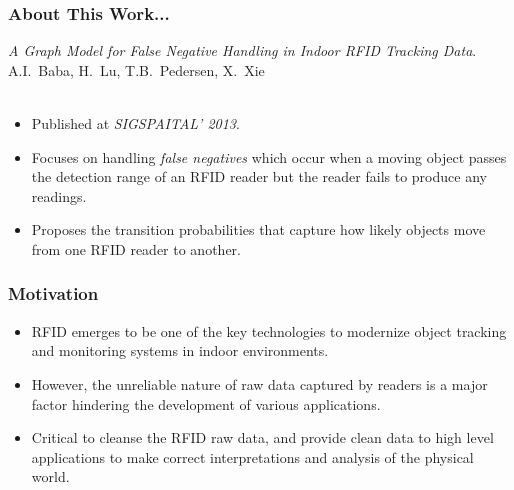 \begin{frame}
\frametitle{About This Work...}

\emph{A Graph Model for False Negative Handling in Indoor RFID Tracking Data}.~\cite{baba2013graph} \\
A.I.~Baba, H.~Lu, T.B.~Pedersen, X.~Xie\\~\\

\begin{itemize}
  \item Published at \emph{SIGSPAITAL' 2013}.
  \item Focuses on handling \emph{false negatives} which occur when a moving object passes the detection range of an RFID reader but the reader fails to produce any readings.
  \item Proposes the transition probabilities that capture how likely objects move from one RFID reader to another.
\end{itemize}

\end{frame}


\begin{frame}
\frametitle{Motivation}

\begin{itemize}
  \item RFID emerges to be one of the key technologies to modernize object tracking and monitoring systems in indoor environments.
  \item However, the unreliable nature of raw data captured by readers is a major factor hindering the development of various applications.
  \item Critical to cleanse the RFID raw data, and provide clean data to high level applications to make correct interpretations and analysis of the physical world.
\end{itemize}

\end{frame}

